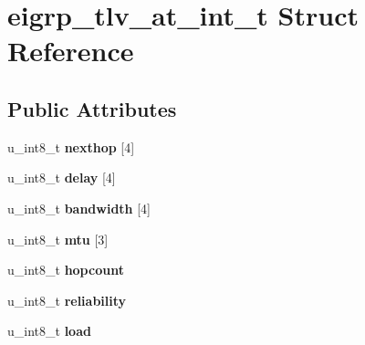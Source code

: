 \hypertarget{structeigrp__tlv__at__int__t}{
\section{eigrp\_\-tlv\_\-at\_\-int\_\-t Struct Reference}
\label{structeigrp__tlv__at__int__t}
}
\subsection*{Public Attributes}
\begin{DoxyCompactItemize}
\item 
\hypertarget{structeigrp__tlv__at__int__t_a512046bd436c8aa47e9449d9be5e1de9}{
u\_\-int8\_\-t {\bfseries nexthop} \mbox{[}4\mbox{]}}
\label{structeigrp__tlv__at__int__t_a512046bd436c8aa47e9449d9be5e1de9}

\item 
\hypertarget{structeigrp__tlv__at__int__t_a9a6f428d10fb9bfbeacb0b6453329db0}{
u\_\-int8\_\-t {\bfseries delay} \mbox{[}4\mbox{]}}
\label{structeigrp__tlv__at__int__t_a9a6f428d10fb9bfbeacb0b6453329db0}

\item 
\hypertarget{structeigrp__tlv__at__int__t_a3a2569389647efc8e9e74bfd17c440c7}{
u\_\-int8\_\-t {\bfseries bandwidth} \mbox{[}4\mbox{]}}
\label{structeigrp__tlv__at__int__t_a3a2569389647efc8e9e74bfd17c440c7}

\item 
\hypertarget{structeigrp__tlv__at__int__t_aeb8999bf771eb136a5dbe17bcfd13efc}{
u\_\-int8\_\-t {\bfseries mtu} \mbox{[}3\mbox{]}}
\label{structeigrp__tlv__at__int__t_aeb8999bf771eb136a5dbe17bcfd13efc}

\item 
\hypertarget{structeigrp__tlv__at__int__t_aec269c0793e953ca8461c24cb3632e64}{
u\_\-int8\_\-t {\bfseries hopcount}}
\label{structeigrp__tlv__at__int__t_aec269c0793e953ca8461c24cb3632e64}

\item 
\hypertarget{structeigrp__tlv__at__int__t_a9f29abe9b7829a90021b8a428fea969f}{
u\_\-int8\_\-t {\bfseries reliability}}
\label{structeigrp__tlv__at__int__t_a9f29abe9b7829a90021b8a428fea969f}

\item 
\hypertarget{structeigrp__tlv__at__int__t_aead51c002249d003d81348a5bedba783}{
u\_\-int8\_\-t {\bfseries load}}
\label{structeigrp__tlv__at__int__t_aead51c002249d003d81348a5bedba783}


\end{DoxyCompactItemize}
